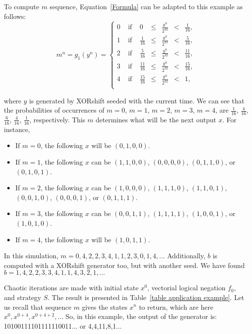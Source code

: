 \documentclass[journal]{IEEEtran}
\begin{document}
To compute $m$ sequence, Equation~\ref{Formula} can be adapted to this example as follows:
\begin{equation}
\label{m1 fuction}
m^n=g_1(y^n)=
\left\{
\begin{array}{llccccc}
0 & \text{ if }&0 &\leqslant&\frac{y^n}{2^{32}}&<&\frac{1}{16},\\
1 & \text{ if }&\frac{1}{16} &\leqslant&\frac{y^n}{2^{32}}&<&\frac{5}{16} ,\\
2 & \text{ if }&\frac{5}{16} &\leqslant&\frac{y^n}{2^{32}}&<&\frac{11}{16},\\
3 & \text{ if }&\frac{11}{16} &\leqslant&\frac{y^n}{2^{32}}&<&\frac{15}{16},\\
4 & \text{ if }&\frac{15}{16} &\leqslant&\frac{y^n}{2^{32}}&<&1,\\
\end{array}
\right.
\end{equation}

\noindent where $y$ is generated by XORshift seeded with the current time. We can see that the probabilities of occurrences of $m=0$, $m=1$, $m=2$, $m=3$, $m=4$, are $\frac{1}{16}$, $\frac{4}{16}$, $\frac{6}{16}$, $\frac{4}{16}$, $\frac{1}{16}$, respectively. This $m$ determines what will be the next output $x$. For instance,
\begin{itemize}
\item If $m=0$, the following $x$ will be $( 0, 1, 0, 0)$.
\item If $m=1$, the following $x$ can be $( 1, 1, 0, 0)$, $( 0, 0, 0, 0)$, $( 0, 1, 1, 0)$, or $( 0, 1, 0, 1)$.
\item If $m=2$, the following $x$ can be $( 1, 0, 0, 0)$, $( 1, 1, 1, 0)$, $( 1, 1, 0, 1)$, $( 0, 0, 1, 0)$, $( 0, 0, 0, 1)$, or $( 0, 1, 1, 1)$.
\item If $m=3$, the following $x$ can be $( 0, 0, 1, 1)$, $( 1, 1, 1, 1)$, $( 1, 0, 0, 1)$, or $( 1, 0, 1, 0)$.
\item If $m=4$, the following $x$ will be $( 1, 0, 1, 1)$.
\end{itemize}

In this simulation, $m = 0, 4, 2, 2, 3, 4, 1, 1, 2, 3, 0, 1, 4,...$ Additionally, $b$ is computed with a XORshift generator too, but with another seed. We have found $b = 1, 4, 2, 2, 3, 3, 4, 1, 1, 4, 3, 2, 1,...$

Chaotic iterations are made with initial state $x^0$, vectorial logical negation $f_0$, and
strategy $S$. The result is presented in Table~\ref{table application example}. Let us recall that sequence $m$ gives the states $x^n$ to return, which are here $x^0, x^{0+4}, x^{0+4+2}, \hdots$ So, in this example, the output of the generator is: 10100111101111110011... or 4,4,11,8,1...
\end{document}
